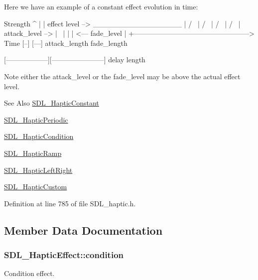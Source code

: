 Here we have an example of a constant effect evolution in time\-: \begin{DoxyVerb}Strength
^
|
|    effect level -->  _________________
|                     /                 \
|                    /                   \
|                   /                     \
|                  /                       \
| attack_level --> |                        \
|                  |                        |  <---  fade_level
|
+--------------------------------------------------> Time
                   [--]                 [---]
                   attack_length        fade_length

[------------------][-----------------------]
delay               length
\end{DoxyVerb}


Note either the attack\-\_\-level or the fade\-\_\-level may be above the actual effect level.

\begin{DoxySeeAlso}{See Also}
\hyperlink{struct_s_d_l___haptic_constant}{S\-D\-L\-\_\-\-Haptic\-Constant} 

\hyperlink{struct_s_d_l___haptic_periodic}{S\-D\-L\-\_\-\-Haptic\-Periodic} 

\hyperlink{struct_s_d_l___haptic_condition}{S\-D\-L\-\_\-\-Haptic\-Condition} 

\hyperlink{struct_s_d_l___haptic_ramp}{S\-D\-L\-\_\-\-Haptic\-Ramp} 

\hyperlink{struct_s_d_l___haptic_left_right}{S\-D\-L\-\_\-\-Haptic\-Left\-Right} 

\hyperlink{struct_s_d_l___haptic_custom}{S\-D\-L\-\_\-\-Haptic\-Custom} 
\end{DoxySeeAlso}


Definition at line 785 of file S\-D\-L\-\_\-haptic.\-h.



\subsection{Member Data Documentation}
\hypertarget{union_s_d_l___haptic_effect_aa8fdd1ba202ccd7e61f48ef9977080d2}{
\subsubsection[{condition}]{ S\-D\-L\-\_\-\-Haptic\-Effect\-::condition}}\label{union_s_d_l___haptic_effect_aa8fdd1ba202ccd7e61f48ef9977080d2}
Condition effect. 

